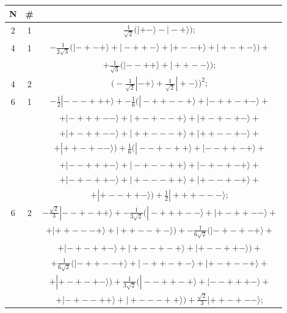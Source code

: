 \documentclass[rmp,amsfonts,showpacs,showkeys,preprint]{revtex4}
\begin{document}
\begin{table}
\begin{tabular}{ccc}
\hline\hline N & \# & \\\hline\hline


2&1&$\frac{1}{{\sqrt{2}}}\big(|+-\rangle-|-+\rangle\big);$\\\hline
4&1&$-\frac{1}{2\sqrt{3}} \big(|-+-+\rangle
+|-++-\rangle+|+--+\rangle +|+-+-\rangle \big)+$\\&&$
+\frac{1}{\sqrt{3}}\big(|--++\rangle +|++--\rangle\big)
;$\\


4&2&$\big(-\frac{1}{{\sqrt{2}}}|-+\rangle
+\frac{1}{{\sqrt{2}}}|+-\rangle\big)^2
;$\\\hline


6&1& $-\frac{1}{2}| --- +++\rangle +-\frac{1}{6}\big(
|-++--+\rangle + |-++-+-\rangle+$\\&&$
+|-+++--\rangle + |+-+--+\rangle +|+-+-+-\rangle
+$\\&&$+ |+-++--\rangle +|++ --- +\rangle +
|++--+-\rangle +$\\&&$+|++-+--\rangle\big) +
\frac{1}{6}\big(|--+-++\rangle +|--++-+\rangle +$\\&&$+
|--+++-\rangle +|-+--++\rangle + |-+-+-+\rangle
+$\\&&$+|-+-++-\rangle + |+ --- ++\rangle
+|+--+-+\rangle +$\\&&$+
|+--++-\rangle\big) +\frac{1}{2}|+++ --- \rangle;$\\

6&2&$ -\frac{{\sqrt{2}}}{3}|--+-++\rangle +-\frac{1}{3
{\sqrt{2}}}\big(|-+++--\rangle +|+-++--\rangle+$\\&&$
+|++ --- +\rangle+
 |++--+-\rangle\big) +-\frac{1}{6 {\sqrt{2}}}\big(|-+-+-+\rangle+$\\&&$ +|-+-++-\rangle
 +
 |+--+-+\rangle +|+--++-\rangle\big)+$\\&&$ +\frac{1}{6 {\sqrt{2}}}\big(|-++--+\rangle +
 |-++-+-\rangle +|+-+--+\rangle+$\\&&$ +|+-+-+-\rangle\big)+
 \frac{1}{3 {\sqrt{2}}}\big(|--++-+\rangle +|--+++-\rangle+$\\&&$ +|-+--++\rangle +
|+ --- ++\rangle\big)+\frac{{\sqrt{2}}}{3}|++-+--\rangle;$\\


\end{tabular}
\end{table}
\end{document}
